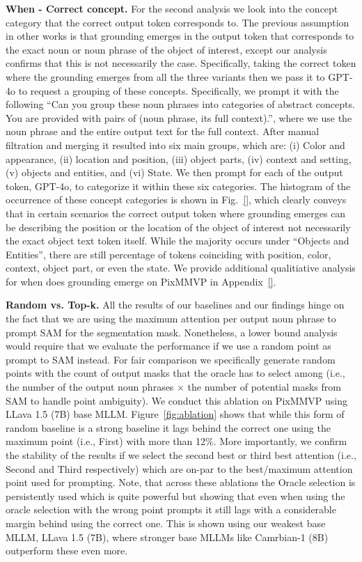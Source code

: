 \textbf{When - Correct concept.} For the second analysis we look into the concept category that the correct output token corresponds to. The previous assumption in other works is that grounding emerges in the output token that corresponds to the exact noun or noun phrase of the object of interest, except our analysis confirms that this is not necessarily the case. Specifically, taking the correct token where the grounding emerges from all the three variants then we pass it to GPT-4o to request a grouping of these concepts. Specifically, we prompt it with the following ``Can you group these noun phrases into categories of abstract concepts. You are provided with pairs of (noun phrase, its full context).'', where we use the noun phrase and the entire output text for the full context. After manual filtration and merging it resulted into six main groups, which are: (i) Color and appearance, (ii) location and position, (iii) object parts, (iv) context and setting, (v) objects and entities, and (vi) State. We then prompt for each of the output token, GPT-4o, to categorize it within these six categories. The histogram of the occurrence of these concept categories is shown in Fig.~\ref{}, which clearly conveys that in certain scenarios the correct output token where grounding emerges can be describing the position or the location of the object of interest not necessarily the exact object text token itself. While the majority occurs under ``Objects and Entities'', there are still percentage of tokens coinciding with position, color, context, object part, or even the state. We provide additional qualitiative analysis for when does grounding emerge on PixMMVP in Appendix~\ref{}.

\textbf{Random vs. Top-k.} All the results of our baselines and our findings hinge on the fact that we are using the maximum attention per output noun phrase to prompt SAM for the segmentation mask. Nonetheless, a lower bound analysis would require that we evaluate the performance if we use a random point as prompt to SAM instead. For fair comparison we specifically generate random points with the count of output masks that the oracle has to select among (i.e., the number of the output noun phrases $\times$ the number of potential masks from SAM to handle point ambiguity). We conduct this ablation on PixMMVP using LLava 1.5 (7B) base MLLM. Figure~\ref{fig:ablation} shows that while this form of random baseline is a strong baseline it lags behind the correct one using the maximum point (i.e., First) with more than 12\%. More importantly, we confirm the stability of the results if we select the second best or third best attention (i.e., Second and Third respectively) which are on-par to the best/maximum attention point used for prompting. Note, that across these ablations the Oracle selection is persistently used which is quite powerful but showing that even when using the oracle selection with the wrong point prompts it still lags with a considerable margin behind using the correct one. 
 This is shown using our weakest base MLLM, LLava 1.5 (7B), where stronger base MLLMs like Camrbian-1 (8B) outperform these even more.

